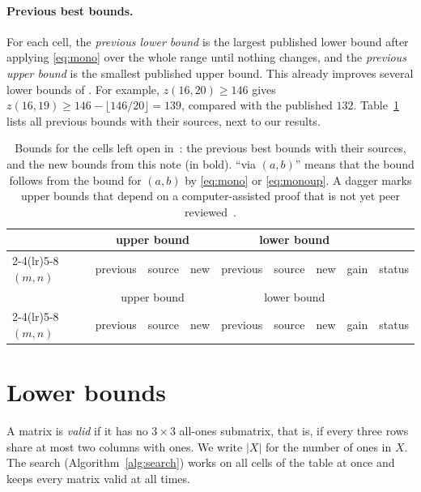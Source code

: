 \documentclass[11pt]{article}
\begin{document}
\paragraph{Previous best bounds.} For each cell, the \emph{previous lower
bound} is the largest published lower bound after applying
\eqref{eq:mono} over the whole range until nothing changes, and the
\emph{previous upper bound} is the smallest published upper bound. This
already improves several lower bounds of \cite{BNRL26}. For example,
$z(16,20)\ge146$ \cite{BNRL26} gives
$z(16,19)\ge146-\lfloor146/20\rfloor=139$, compared with the published
$132$. Table~\ref{tab:summary} lists all previous bounds with their
sources, next to our results.

{\footnotesize
\setlength{\tabcolsep}{4pt}
\setlength{\LTcapwidth}{\textwidth}
\begin{longtable}{lrlrrlrrl}
\caption{Bounds for the \NumOpen{} cells left open in~\cite{BNRL26}: the
previous best bounds with their sources, and
the new bounds from this note (in bold). ``via $(a,b)$'' means that the
bound follows from the bound for $(a,b)$ by \eqref{eq:mono} or
\eqref{eq:monoup}. A dagger marks upper bounds that depend on a
computer-assisted proof that is not yet peer reviewed~\cite{Afr26,Hou26,Fie26}.}
\label{tab:summary}\\
\toprule
 & \multicolumn{3}{c}{upper bound} & \multicolumn{4}{c}{lower bound} & \\
\cmidrule(lr){2-4}\cmidrule(lr){5-8}
$(m,n)$ & previous & source & new & previous & source & new & gain & status \\
\midrule
\endfirsthead
\toprule
 & \multicolumn{3}{c}{upper bound} & \multicolumn{4}{c}{lower bound} & \\
\cmidrule(lr){2-4}\cmidrule(lr){5-8}
$(m,n)$ & previous & source & new & previous & source & new & gain & status \\
\midrule
\endhead

\end{longtable}
}

\section{Lower bounds}\label{sec:lower}

A matrix is \emph{valid} if it has no $3\times3$ all-ones submatrix, that
is, if every three rows share at most two columns with ones. We write $|X|$
for the number of ones in $X$. The search (Algorithm~\ref{alg:search})
works on all cells of the table at once and keeps every matrix valid at all
times.
\end{document}
